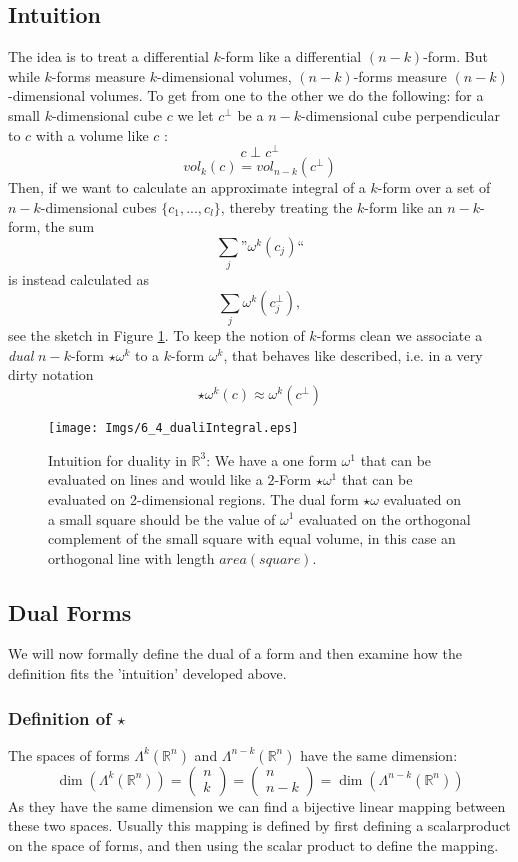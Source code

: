 \subsection{Intuition}
\label{subsec:hodgeintuition}
The idea is to treat a differential $k$-form like a differential $(n-k)$-form. But while $k$-forms measure $k$-dimensional volumes, $(n-k)$-forms measure $(n-k)$-dimensional volumes.
To get from one to the other we do the following: for a small $k$-dimensional cube $c$ we let $c^\perp$ be a $n-k$-dimensional cube perpendicular to $c$ with a volume like $c$ :
\[c\perp c^\perp \]
\[vol_k(c) = vol_{n-k}(c^\perp)\] 
Then, if we want to calculate an approximate integral of a $k$-form over a set of $n-k$-dimensional cubes $\{c_1,...,c_l\}$, thereby treating the $k$-form like an $n-k$-form, the sum
\[\sum_{j} \text{''}\omega^k(c_j)\text{``}\]
is instead calculated as 
\[\sum_{j} \omega^k(c_j^{\perp}),\]
see the sketch in Figure \ref{fig::6_1_dualIntegral}. To keep the notion of $k$-forms clean we associate a \emph{dual} $n-k$-form $\star\omega^k$ to a $k$-form $\omega^k$, that behaves like described, i.e. in a very dirty notation
\[\star\omega^k(c) \approx  \omega^k(c^\perp)\]
\begin{figure}[t]
\begin{center}
\texttt{[image: Imgs/6\_4\_dualiIntegral.eps]}
\end{center}
\caption{Intuition for duality in $\mathbb R^3$: We have a one form $\omega^1$ that can be evaluated on lines and would like a $2$-Form $\star \omega^1$ that can be evaluated on 2-dimensional regions. The dual form $\star \omega$ evaluated on a small square should be the value of $\omega^1$ evaluated on the orthogonal complement of the small square with equal volume, in this case an orthogonal line with length $area(square)$. }
\label{fig::6_1_dualIntegral}
\end{figure}

\subsection{Dual Forms}
We will now formally define the dual of a form and then examine how the definition fits the 'intuition' developed above. 

\subsubsection{Definition of $\star$}
The spaces of forms $\Lambda^k(\mathbb R^n)$ and $\Lambda^{n-k}(\mathbb R^n)$ have the same dimension:
\[\dim(\Lambda^k(\mathbb R^n)) = \begin{pmatrix}
n \\ k
\end{pmatrix}= \begin{pmatrix}
n \\ n-k
\end{pmatrix} = \dim(\Lambda^{n-k}(\mathbb R^n))\]
As they have the same dimension we can find a bijective linear mapping between these two spaces. Usually this mapping is defined by first defining  a scalarproduct on the space of forms, and then using the scalar product to define the mapping. 


